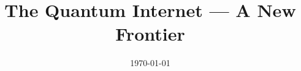 \documentclass[draft, twocolumn, aps, rmp, amsmath, amssymb, nofootinbib, superscriptaddress, longbibliography, floatfix, table-of-contents, eqsecnum]{revtex4-1}
\let\stdpart\part
\renewcommand\part{\newpage\stdpart}
\begin{document}
\title{\huge{The Quantum Internet --- A New Frontier}}



\date{\today}

\frenchspacing



\maketitle





%
%
%
%
%
%
%
%
%
%
%
%
%
%
%
%
%
%
%
%
%
%
%
%
%
%
%
%
%
%
%
%
%
%
%
%
%
\end{document}
